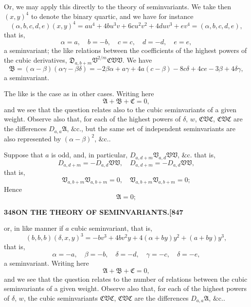 \documentclass[11pt,a4paper]{book}
\begin{document}
Or, we may apply this directly to the theory of seminvariants. We take then $(x, y)^4$ to denote the binary quartic, and we have for instance
\[
(\alpha, b, c, d, e)(x, y)^4 = au^4 + 4bu^3v + 6cu^2v^2 + 4duv^3 + ev^4 = (\alpha, b, c, d, e),
\]
that is,
\[
\alpha = a, \quad b = -b, \quad c = c, \quad d = -d, \quad e = e,
\]
a seminvariant; the like relations between the coefficients of the highest powers of the cubic derivatives, $\mathfrak{D}_{a,b+m}\mathfrak{V}^{2/m}\mathfrak{C}\mathfrak{V}\mathfrak{V}$. We have
\[
\mathfrak{B} = (\alpha - \beta)(\alpha\gamma - \beta\delta) = -2\beta\alpha + a\gamma + 4a(c - \beta) - 8c\delta + 4ce - 3\beta + 4\delta\gamma,
\]
a seminvariant.

The like is the case as in other cases. Writing here
\[
\mathfrak{A} + \mathfrak{B} + \mathfrak{C} = 0,
\]
and we see that the question relates also to the cubic seminvariants of a given weight. Observe also that, for each of the highest powers of $\delta$, $w$, $\mathfrak{C}\mathfrak{V}\mathfrak{C}$, $\mathfrak{C}\mathfrak{V}\mathfrak{C}$ are the differences $D_{a,a}\mathfrak{A}$, $\&\text{c.}$, but the same set of independent seminvariants are also represented by $(\alpha - \beta)^2$, $\&\text{c.}$.

Suppose that $a$ is odd, and, in particular, $D_{a,d+m}\mathfrak{V}_{a,d}\mathfrak{V}\mathfrak{V}$, $\&\text{c.}$ that is,
\[
D_{a,d+m} = -D_{a,d}\mathfrak{V}\mathfrak{V}, \quad D_{a,d+m} = -D_{a,d}\mathfrak{V}\mathfrak{V},
\]
that is,
\[
\mathfrak{V}_{a,b+m}\mathfrak{V}_{a,b+m} = 0, \quad \mathfrak{V}_{a,b+m}\mathfrak{V}_{a,b+m} = 0;
\]
Hence
\[
\mathfrak{A} = 0;
\]

\newpage
\setcounter{page}{348}

\noindent\textbf{348}\hfill\textbf{ON THE THEORY OF SEMINVARIANTS.}\hfill\textbf{[847}

\bigskip

\noindent or, in like manner if $a$ cubic seminvariant, that is,
\[
(b, b, b)(\delta, x, y)^3 = -bv^3 + 4bv^2y + 4(\alpha + by)y^2 + (a + by)y^3,
\]
that is,
\[
\alpha = -a, \quad \beta = -b, \quad \delta = -d, \quad \gamma = -c, \quad \delta = -e,
\]
a seminvariant. Writing here
\[
\mathfrak{A} + \mathfrak{B} + \mathfrak{C} = 0,
\]
and we see that the question relates to the number of relations between the cubic seminvariants of a given weight. Observe also that, for each of the highest powers of $\delta$, $w$, the cubic seminvariants $\mathfrak{C}\mathfrak{V}\mathfrak{C}$, $\mathfrak{C}\mathfrak{V}\mathfrak{C}$ are the differences $D_{a,a}\mathfrak{A}$, $\&\text{c.}$.
\end{document}
